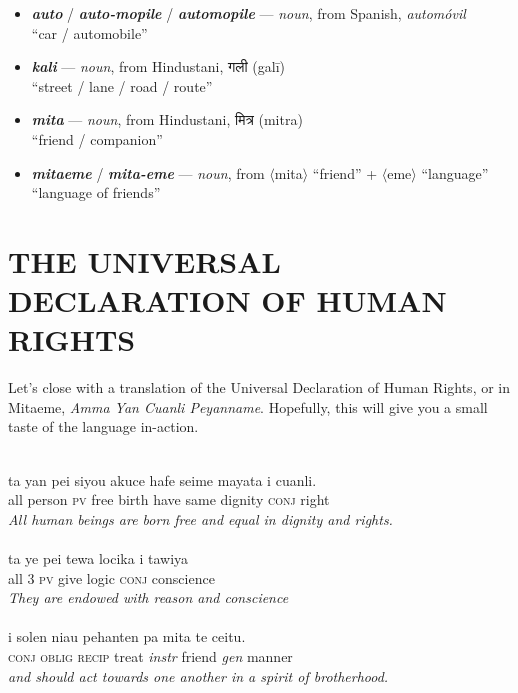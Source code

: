 \documentclass[a4paper]{article}
\begin{document}
\begin{itemize}
	\item \textbf{\textit{auto}} / \textbf{\textit{auto-mopile}} / \textbf{\textit{automopile}}  — \textit{noun}, from Spanish, \textit{automóvil} \\``car / automobile''
	\item \textbf{\textit{kali}}  — \textit{noun}, from Hindustani, {\hmfont गली} (galī) \\ ``street / lane / road / route''
	\item \textbf{\textit{mita}}  — \textit{noun}, from Hindustani, {\hmfont मित्र} (mitra) \\ ``friend / companion''
	\item \textbf{\textit{mitaeme}} / \textbf{\textit{mita-eme}}  — \textit{noun}, from $\langle$mita$\rangle$ ``friend'' + $\langle$eme$\rangle$ ``language'' \\ ``language of friends''
	
\end{itemize}

\section{THE UNIVERSAL DECLARATION OF HUMAN RIGHTS}

Let's close with a translation of the Universal Declaration of Human Rights, or in Mitaeme, \textit{Amma Yan Cuanli Peyanname}.
Hopefully, this will give you a small taste of the language in-action.\\
\\
\hspace*{1cm}%
\begin{minipage}{.8\textwidth}%
ta yan pei siyou akuce hafe seime mayata i cuanli.\\
all person \textsc{pv} free birth have same dignity \textsc{conj} right\\
\textit{All human beings are born free and equal in dignity and rights.}\\
\\
ta ye pei tewa locika i tawiya\\
all \textsc{3 pv} give logic \textsc{conj} conscience\\
\textit{They are endowed with reason and conscience}\\
\\
i solen niau pehanten pa mita te ceitu.\\
\textsc{conj oblig recip} treat \textit{instr} friend \textit{gen} manner\\
\textit{and should act towards one another in a spirit of brotherhood.}
\end{minipage}%
\end{document}
